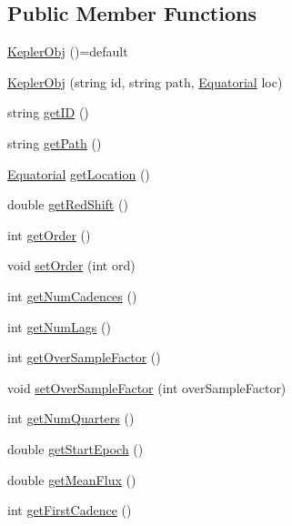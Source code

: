\subsection*{Public Member Functions}
\begin{DoxyCompactItemize}
\item 
\hyperlink{class_kepler_obj_afd0b831e625b2c4f5c75c458a2dd0ba7}{Kepler\-Obj} ()=default
\item 
\hyperlink{class_kepler_obj_a6f5497c0170b840769e22e317332644e}{Kepler\-Obj} (string id, string path, \hyperlink{class_equatorial}{Equatorial} loc)
\item 
string \hyperlink{class_kepler_obj_a268fc8a6f87be9489c5ee4d52903fd2c}{get\-I\-D} ()
\item 
string \hyperlink{class_kepler_obj_a3e99e434a7328f45137b94ae9557ceeb}{get\-Path} ()
\item 
\hyperlink{class_equatorial}{Equatorial} \hyperlink{class_kepler_obj_ace9583f6845dc6db9e0e23ec60bb0c54}{get\-Location} ()
\item 
double \hyperlink{class_kepler_obj_aa39f1254aa63f9cec80061be6da46a58}{get\-Red\-Shift} ()
\item 
int \hyperlink{class_kepler_obj_acd3e416bd288f43a30a7b753a6697f99}{get\-Order} ()
\item 
void \hyperlink{class_kepler_obj_af7e062113cc6222956d892733b36142f}{set\-Order} (int ord)
\item 
int \hyperlink{class_kepler_obj_ad953af55b06af0234c68e54c6275d7e4}{get\-Num\-Cadences} ()
\item 
int \hyperlink{class_kepler_obj_a1980eedbf8b3b8c7e04b41dc887630f1}{get\-Num\-Lags} ()
\item 
int \hyperlink{class_kepler_obj_ad44d1900ee67daddc8d7c93887a05f46}{get\-Over\-Sample\-Factor} ()
\item 
void \hyperlink{class_kepler_obj_a8cf9e305908521eaf390f5dd96fe9b4a}{set\-Over\-Sample\-Factor} (int over\-Sample\-Factor)
\item 
int \hyperlink{class_kepler_obj_a37ec5e30230b9e91a9f4e54033097fc9}{get\-Num\-Quarters} ()
\item 
double \hyperlink{class_kepler_obj_a5fd1060cb4c3c1cbc804e0bf20eddfa0}{get\-Start\-Epoch} ()
\item 
double \hyperlink{class_kepler_obj_a195fb841c86bb6d947bcd9a7c45ec56e}{get\-Mean\-Flux} ()
\item 
int \hyperlink{class_kepler_obj_a8f53290957f8902ddb5668a21527e4ba}{get\-First\-Cadence} ()
\item 

\end{DoxyCompactItemize}
